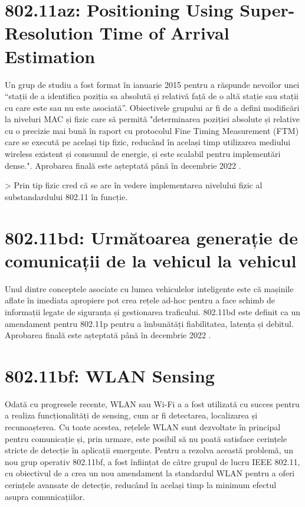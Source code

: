 \documentclass[a4paper,12pt]{report}
\begin{document}
\section{802.11az: Positioning Using Super-Resolution Time of Arrival Estimation}

Un grup de studiu a fost format în ianuarie 2015 pentru a răspunde nevoilor unei ``stații de a identifica poziția sa absolută și relativă față de o altă stație sau stații cu care este sau nu este asociată''.
Obiectivele grupului ar fi de a defini modificări la niveluri \ac{MAC} și fizic care să permită "determinarea poziției absolute și relative cu o precizie mai bună în raport cu protocolul Fine Timing Measurement (\ac{FTM}) care se execută pe același tip fizic, reducând în același timp utilizarea mediului wireless existent și consumul de energie, și este scalabil pentru implementări dense.".
Aprobarea finală este așteptată până în decembrie 2022 \cite{tech_802_11az}.

> Prin tip fizic cred că se are în vedere implementarea nivelului fizic al substandardului 802.11 în funcție.

\section{802.11bd: Următoarea generație de comunicații de la vehicul la vehicul}

Unul dintre conceptele asociate cu lumea vehiculelor inteligente este că mașinile aflate în imediata apropiere pot crea rețele ad-hoc pentru a face schimb de informații legate de siguranța și gestionarea traficului.
802.11bd este definit ca un amendament pentru 802.11p pentru a îmbunătăți fiabilitatea, latența și debitul.
Aprobarea finală este așteptată până în decembrie 2022 \cite{802_11bd}.

\section{802.11bf: \ac{WLAN} Sensing}

Odată cu progresele recente, \ac{WLAN} sau \ac{Wi-Fi} a a fost utilizată cu succes pentru a realiza funcționalități de sensing, cum ar fi detectarea, localizarea și recunoașterea.
Cu toate acestea, rețelele \ac{WLAN} sunt dezvoltate în principal pentru comunicație și, prin urmare, este posibil să nu poată satisface cerințele stricte de detecție în aplicații emergente.
Pentru a rezolva această problemă, un nou grup operativ 802.11bf, a fost înființat de către grupul de lucru \ac{IEEE} 802.11, cu obiectivul de a crea un nou amendament la standardul \ac{WLAN} pentru a oferi cerințele avansate de detecție, reducând în același timp la minimum efectul asupra comunicațiilor.
\end{document}
